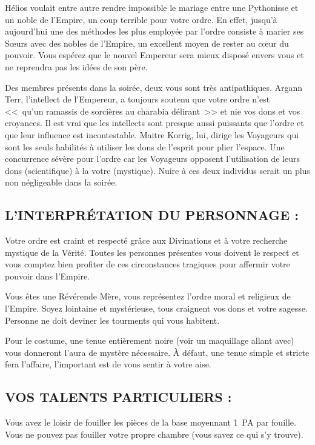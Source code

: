 \documentclass[14pt,twocolumn]{extarticle}
\begin{document}
Hélios voulait entre autre rendre impossible le mariage entre une Pythonisse et
un noble de l'Empire, un coup terrible pour votre ordre. En effet, jusqu'à
aujourd'hui une des méthodes les plus employée par l'ordre consiste à marier
ses Sœurs avec des nobles de l'Empire, un excellent moyen de rester au cœur
du pouvoir. Vous espérez que le nouvel Empereur sera mieux disposé envers vous
et ne reprendra pas les idées de son père.

Des membres présents dans la soirée, deux vous sont très antipathiques. Argann
Terr, l'intellect de l'Empereur, a toujours soutenu que votre ordre n'est
<<~qu'un ramassis de sorcières au charabia délirant~>> et nie vos dons et vos
croyances. Il est vrai que les intellects sont presque aussi puissants que
l'ordre et que leur influence est incontestable. Maitre Korrig, lui, dirige les
Voyageurs qui sont les seuls habilités à utiliser les dons de l'esprit pour
plier l'espace. Une concurrence sévère pour l'ordre car les Voyageurs opposent
l'utilisation de leurs dons (scientifique) à la votre (mystique). Nuire à ces
deux individus serait un plus non négligeable dans la soirée.

\subsection{L'INTERPRÉTATION DU PERSONNAGE :}

Votre ordre est craint et respecté grâce aux Divinations et à votre recherche
mystique de la Vérité. Toutes les personnes présentes vous doivent le respect
et vous comptez bien profiter de ces circonstances tragiques pour affermir
votre pouvoir dans l'Empire.

Vous êtes une Révérende Mère, vous représentez l'ordre moral et religieux
de l'Empire. Soyez lointaine et mystérieuse, tous craignent vos dons et votre
sagesse. Personne ne doit deviner les tourments qui vous habitent.

Pour le costume, une tenue entièrement noire (voir un maquillage allant avec)
vous donneront l'aura de mystère nécessaire. À défaut, une tenue simple et
stricte fera l'affaire, l'important est de vous sentir à votre aise.

\subsection{VOS TALENTS PARTICULIERS :}

Vous avez le loisir de fouiller les pièces de la base moyennant 1~PA par
fouille. Vous ne pouvez pas fouiller votre propre chambre (vous savez ce qui
s'y trouve).
\end{document}
